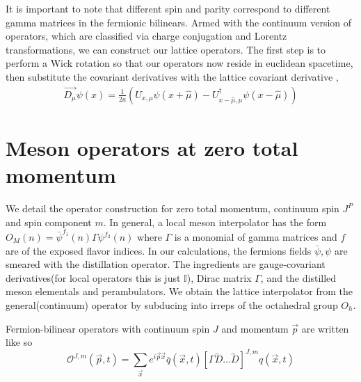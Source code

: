 It is important to note that different spin and parity correspond to different gamma matrices in the fermionic bilinears. Armed with the continuum version of operators, which are classified via charge conjugation and Lorentz transformations, we can construct our lattice operators. The first step is to perform a Wick rotation so that our operators now reside in euclidean spacetime, then substitute the covariant derivatives with the lattice covariant derivative \cite{G_ckeler_1996}, 
\begin{align}
    \overrightarrow{D_\mu}\psi(x) = \frac{1}{2a}(U_{x,\mu}\psi(x + \hat{\mu}) - U_{x-\hat{\mu},\mu}^\dagger\psi(x - \hat{\mu}))
\end{align}

\section{Meson operators at zero total momentum}
We detail the operator construction for zero total momentum, continuum spin $J^P$ and spin component $m$. In general, a local meson interpolator has the form $O_M(n) = \bar{\psi}^{f_1}(n)\Gamma\psi^{f_2}(n)$ where $\Gamma$ is a monomial of gamma matrices and $f$ are of the exposed flavor indices. In our calculations, the fermions fields $\bar{\psi},\psi$ are smeared with the distillation operator. The ingredients are gauge-covariant derivatives(for local operators this is just $\mathbb{I}$), Dirac matrix $\Gamma$, and the distilled meson elementals and perambulators. We obtain the lattice interpolator from the general(continuum) operator by subducing into irreps of the octahedral group $O_h$. 

Fermion-bilinear operators with continuum spin $J$ and momentum $\vec{p}$ are written like so \cite{Cheung_2017}
    \begin{equation}
    \mathcal{O}^{J,m}(\vec{p},t) = \sum_{\vec{x}} e^{i\vec{p}\vec{x}} \bar{q}(\vec{x},t) [\Gamma \overleftrightarrow{D}\dots \overleftrightarrow{D}]^{J,m}q(\vec{x},t)
\end{equation}

